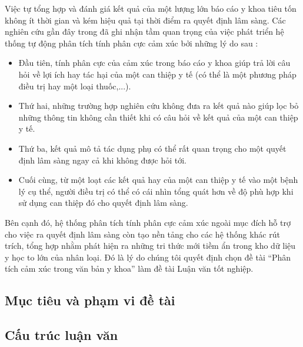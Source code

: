 Việc tự tổng hợp và đánh giá kết quả của một lượng lớn báo cáo y khoa tiêu tốn không ít thời gian và kém hiệu quả tại thời điểm ra quyết định lâm sàng. Các nghiên cứu gần đây trong \cite{medhat2014sentiment} đã ghi nhận tầm quan trọng của việc phát triển hệ thống tự động phân tích tính phân cực cảm xúc bởi những lý do sau \cite{niu2005analysis}: 
\begin{itemize}
\item Đầu tiên, tính phân cực của cảm xúc trong báo cáo y khoa giúp trả lời câu hỏi về lợi ích hay tác hại của một can thiệp y tế (có thể là một phương pháp điều trị hay một loại thuốc,...).
\item Thứ hai, những trường hợp nghiên cứu không đưa ra kết quả nào giúp lọc bỏ những thông tin không cần thiết khi có câu hỏi về kết quả của một can thiệp y tế.
\item Thứ ba, kết quả \tieucuc mô tả tác dụng phụ có thể rất quan trọng cho một quyết định lâm sàng ngay cả khi không được hỏi tới.
\item Cuối cùng, từ một loạt các kết quả \tichcuc hay \tieucuc của một can thiệp y tế vào một bệnh lý cụ thể, người điều trị có thể có cái nhìn tổng quát hơn về độ phù hợp khi sử dụng can thiệp đó cho quyết định lâm sàng.
\end{itemize}

Bên cạnh đó, hệ thống phân tích tính phân cực cảm xúc ngoài mục đích hỗ trợ cho việc ra quyết định lâm sàng còn tạo nền tảng cho các hệ thống khác rút trích, tổng hợp nhằm phát hiện ra những tri thức mới tiềm ẩn trong kho dữ liệu y học to lớn của nhân loại. Đó là lý do chúng tôi quyết định chọn đề tài ``Phân tích cảm xúc trong văn bản y khoa'' làm đề tài Luận văn tốt nghiệp.

\subsection{Mục tiêu và phạm vi đề tài}


\subsection{Cấu trúc luận văn}
